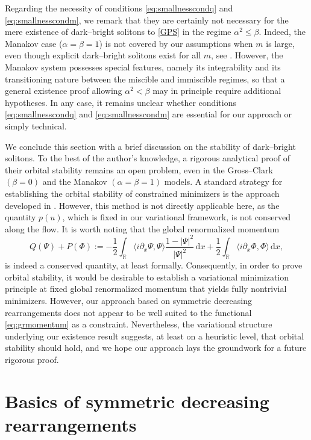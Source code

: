 \documentclass[11pt]{article}
\newcommand{\R}{\mathbb{R}}
\renewcommand{\d}{\,\mathrm{d}}
\theoremstyle{plain}
\theoremstyle{definition}
\theoremstyle{remark}
\numberwithin{equation}{section}
\begin{document}
{{Regarding the necessity of conditions \eqref{eq:smallnesscondq} and \eqref{eq:smallnesscondm}, we remark that they are certainly not necessary for the mere existence of dark--bright solitons to \eqref{GPS} in the regime $\alpha^{2}\leq \beta$. Indeed, the Manakov case ($\alpha=\beta=1$) is not covered by our assumptions when $m$ is large, even though explicit dark--bright solitons exist for all $m$, see \cite{Busch_Anglin, Sheppard_Kivshar}. However, the Manakov system possesses special features, namely its integrability and its transitioning nature between the miscible and immiscible regimes, so that a general existence proof allowing $\alpha^{2}<\beta$ may in principle require additional hypotheses. In any case, it remains unclear whether conditions \eqref{eq:smallnesscondq} and \eqref{eq:smallnesscondm} are essential for our approach or simply technical.
}

We conclude this section with a brief discussion on the stability of dark--bright solitons. To the best of the author's knowledge, a rigorous analytical proof of their orbital stability remains an open problem, even in the Gross--Clark $(\beta=0)$ and the Manakov $(\alpha=\beta=1)$ models. A standard strategy for establishing the orbital stability of constrained minimizers is the approach developed in \cite{cazlions}. However, this method is not directly applicable here, as the quantity $p(u)$, which is fixed in our variational framework, is not conserved along the flow. {It is worth noting that the global renormalized momentum
\begin{equation}\label{eq:grmomentum}
    Q(\Psi)+P(\Phi):=-\frac12\int_\R\langle i\partial_x\Psi,\Psi\rangle\frac{1-|\Psi|^2}{|\Psi|^2}\d x + \frac12\int_\R \langle i\partial_x\Phi,\Phi\rangle\d x,
\end{equation}
is indeed a conserved quantity, at least formally. Consequently, in order to prove orbital stability, it would be desirable to establish a variational minimization principle at fixed global renormalized momentum that yields fully nontrivial minimizers. However, our approach based on symmetric decreasing rearrangements does not appear to be well suited to the functional \eqref{eq:grmomentum} as a constraint.} Nevertheless, the variational structure underlying our existence result suggests, at least on a heuristic level, that orbital stability should hold, and we hope our approach lays the groundwork for a future rigorous proof.

\section{Basics of symmetric decreasing rearrangements}\label{sec:rearrangements}

}
\end{document}
